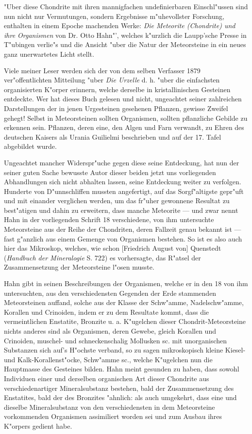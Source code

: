 \documentclass[a4paper, 11pt, oneside]{article}
\begin{document}
"Uber diese Chondrite mit ihren mannigfachen undefinierbaren Einschl"ussen sind nun nicht nur Vermutungen, sondern Ergebnisse m"uhevollster Forschung, enthalten in einem Epoche machenden Werke: \emph{Die Meteorite (Chondrite) und ihre Organismen} von Dr. Otto Hahn"', welches k"urzlich die Laupp'sche Presse in T"ubingen verlie"s und die Ansicht "uber die Natur der Meteorsteine in ein neues ganz unerwartetes Licht stellt.

Viele meiner Leser werden sich der von dem selben Verfasser 1879 ver"offentlichten Mitteilung "uber \emph{Die Urzelle} d. h. "uber die einfachsten organisierten K"orper erinnern, welche derselbe in kristallinischen Gesteinen entdeckte. Wer hat dieses Buch gelesen und nicht, ungeachtet seiner zahlreichen Darstellungen der in jenen Urgesteinen gesehenen Pflanzen, gewisse Zweifel gehegt! Selbst in Meteorsteinen sollten Organismen, sollten pflanzliche Gebilde zu erkennen sein. Pflanzen, deren eine, den Algen und Farn verwandt, zu Ehren des deutschen Kaisers als Urania Guilielmi beschrieben und auf der 17. Tafel abgebildet wurde.

Ungeachtet mancher Widerspr"uche gegen diese seine Entdeckung, hat nun der seiner guten Sache bewusste Autor dieser beiden jetzt uns vorliegenden Abhandlungen sich nicht abhalten lassen, seine Entdeckung weiter zu verfolgen. Hunderte von D"unnschliffen mussten angefertigt, auf das Sorgf"altigste gepr"uft und mit einander verglichen werden, um das fr"uher gewonnene Resultat zu best"atigen und dahin zu erweitern, dass manche Meteorite --- und zwar nennt Hahn in der vorliegenden Schrift 18 verschiedene, von ihm untersuchte Meteorsteine aus der Reihe der Chondriten, deren Fallzeit genau bekannt ist --- fast g"anzlich aus einem Gemenge von Organismen bestehen. So ist es also auch hier das Mikroskop, welches, wie schon [Friedrich August von] Quenstedt (\emph{Handbuch der Mineralogie} S. 722) es vorhersagte, das R"atsel der Zusammensetzung der Meteorsteine l"osen musste.

Hahn gibt in seinen Beschreibungen der Organismen, welche er in den 18 von ihm untersuchten, aus den verschiedensten Gegenden der Erde stammenden Meteorsteinen auffand, solche aus der Klasse der Schw"amme, Nadelschw"amme, Korallen und Crinoiden, indem er zu dem Resultate kommt, dass die vermeintlichen Enstatite, Bronzite u. a. K"ugelchen dieser Chondrit-Meteorsteine nichts anderes sind als Organismen, deren Gewebe, gleich Korallen und Crinoiden, muschel- und schneckenschalig Mollusken sc. mit unorganischen Substanzen sich auf's H"ochste verband, so zu sagen mikroskopisch kleine Kiesel- und Kalk-Korallenst"ocke, Schw"amme sc., welche K"ugelchen nun die Hauptmasse des Gesteines bilden. Hahn meint gesunden zu haben, dass sowohl Individuen einer und derselben organischen Art dieser Chondrite aus verschiedenartiger Mineralsubstanz bestehen, bald der Zusammensetzung des Enstatites, bald der des Bronzites "ahnlich: als auch umgekehrt, dass eine und dieselbe Mineralsubstanz von den verschiedensten in dem Meteorsteine vorkommenden Organismen assimiliert worden sei und zum Ausbau ihres K"orpers gedient habe.
\end{document}
